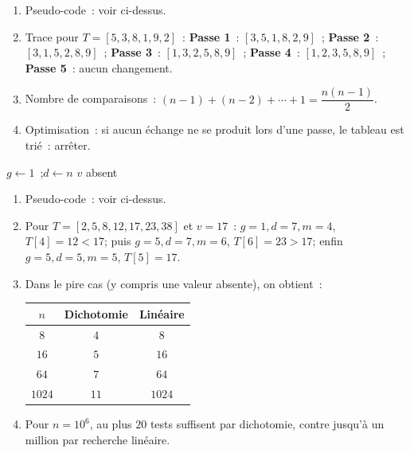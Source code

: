
\begin{algorithm}[H]
\caption{Tri \`a bulles}
\end{algorithm}

\begin{enumerate}
  \item Pseudo-code~: voir ci-dessus.
  \item Trace pour $T=[5,3,8,1,9,2]$~:
        \textbf{Passe 1}~: $[3,5,1,8,2,9]$~;
        \textbf{Passe 2}~: $[3,1,5,2,8,9]$~;
        \textbf{Passe 3}~: $[1,3,2,5,8,9]$~;
        \textbf{Passe 4}~: $[1,2,3,5,8,9]$~;
        \textbf{Passe 5}~: aucun changement.
  \item Nombre de comparaisons~: $(n-1)+(n-2)+\cdots+1=\dfrac{n(n-1)}{2}$.
  \item Optimisation~: si aucun \'echange ne se produit lors d'une passe,
        le tableau est tri\'e~: arr\^eter.
\end{enumerate}


\begin{algorithm}[H]
\caption{Recherche dichotomique}
$g \leftarrow 1$~;\quad $d \leftarrow n$\;
\Afficher \og $v$ absent\fg\;
\end{algorithm}

\begin{enumerate}
  \item Pseudo-code~: voir ci-dessus.
  \item Pour $T=[2,5,8,12,17,23,38]$ et $v=17$~:
        $g=1,d=7,m=4$, $T[4]=12<17$; puis $g=5,d=7,m=6$,
        $T[6]=23>17$; enfin $g=5,d=5,m=5$, $T[5]=17$.
  \item Dans le pire cas (y compris une valeur absente), on obtient~:
        \begin{center}
        \begin{tabular}{|c|c|c|}\hline
        $n$ & Dichotomie & Lin\'eaire \\ \hline
        $8$ & $4$ & $8$ \\ $16$ & $5$ & $16$ \\
        $64$ & $7$ & $64$ \\ $1024$ & $11$ & $1024$ \\ \hline
        \end{tabular}
        \end{center}
  \item Pour $n=10^6$, au plus $20$ tests suffisent par dichotomie,
        contre jusqu'\`a un million par recherche lin\'eaire.
\end{enumerate}

